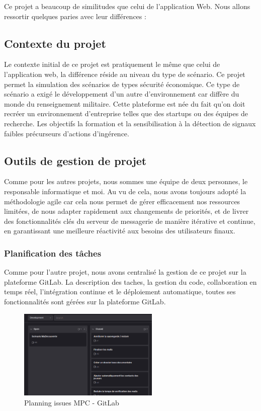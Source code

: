 Ce projet a beaucoup de similitudes que celui de l'application Web. Nous allons ressortir quelques paries avec leur différences :


\subsection{Contexte du projet}
Le contexte initial de ce projet est pratiquement le même que celui de l'application web, la différence réside au niveau du type de scénario.
Ce projet permet la simulation des scénarios de types sécurité économique.
Ce type de scénario a exigé le développement d'un autre d'environnement car diffère du monde du renseignement militaire.
Cette plateforme est née du fait qu'on doit recréer un environnement d’entreprise telles que des startups ou des équipes de recherche.
Les objectifs la formation et la sensibilisation à la détection de signaux faibles précurseurs d’actions d’ingérence.


\subsection{Outils de gestion de projet}
Comme pour les autres projets, nous sommes une équipe de deux personnes, le responsable informatique et moi. Au vu de cela, nous avons toujours adopté la méthodologie agile car cela nous permet de gérer efficacement nos ressources limitées, de nous adapter rapidement aux changements de priorités, et de livrer des fonctionnalités clés du serveur de messagerie de manière itérative et continue, en garantissant une meilleure réactivité aux besoins des utilisateurs finaux.

\subsubsection{Planification des tâches}
Comme pour l'autre projet, nous avons centralisé la gestion de ce projet sur la plateforme GitLab.
La description des taches, la gestion du code, collaboration en temps réel, l’intégration continue et le déploiement automatique, toutes ses fonctionnalités sont gérées sur la plateforme GitLab.

\begin{figure}[h]
	\center
	\includegraphics[width=0.6\textwidth]{./images/gitlab_mpc.png}
	\caption[Planification des issues MPC]{Planning issues MPC - GitLab}\label{fig:gitlab_mpc}
\end{figure}


